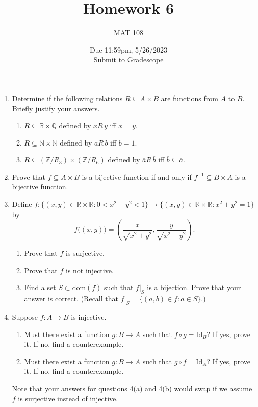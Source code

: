 \documentclass{article}
\title{Homework 6}
\author{MAT 108}
\date{Due 11:59pm, 5/26/2023\\ 
\vspace{0.1cm}
Submit to Gradescope}
\newcommand{\bR}{\mathbb{R}}
\newcommand{\bQ}{\mathbb{Q}}
\newcommand{\bZ}{\mathbb{Z}}
\newcommand{\bN}{\mathbb{N}}
\begin{document}
 
\maketitle

{\large

\begin{enumerate}[labelindent=0pt,leftmargin=0pt]

    \setlength{\itemsep}{13pt} 

    \item Determine if the following relations $R\subseteq A\times B$ are functions from $A$ to $B$. Briefly justify your answers.\begin{enumerate}
    \item $R\subseteq\bR\times\bQ$ defined by $xR\,y$ iff $x=y$.
    \item $R\subseteq\bN\times\bN$ defined by $aR\,b$ iff $b=1$.
    \item $R\subseteq (\bZ/R_3)\times(\bZ/R_6)$ defined by $\overline{a}R\,\overline{b}$ iff $\overline{b}\subseteq\overline{a}$.
    \end{enumerate}
    

    \item Prove that $f\subseteq A\times B$ is a bijective function if and only if $f^{-1}\subseteq B\times A$ is a bijective function.

    \item Define $f:\{(x,y)\in\bR\times\bR:0<x^2+y^2<1\}\to\{(x,y)\in\bR\times\bR:x^2+y^2=1\}$ by $$f\big((x,y)\big) = \left(\frac{x}{\sqrt{x^2+y^2}},\frac{y}{\sqrt{x^2+y^2}}\right).$$
    \begin{enumerate}
    \item Prove that $f$ is surjective.
    \item Prove that $f$ is not injective.
    \item Find a set $S\subset\text{dom}(f)$ such that $f|_S$ is a bijection. Prove that your answer is correct. (Recall that $f|_S=\{(a,b)\in f: a\in S\}$.)
    \end{enumerate}

    \item Suppose $f:A\to B$ is injective.
    \begin{enumerate}
    \item Must there exist a function $g:B\to A$ such that $f\circ g = \text{Id}_B$? If yes, prove it. If no, find a counterexample.
    \item Must there exist a function $g:B\to A$ such that $g\circ f = \text{Id}_A$? If yes, prove it. If no, find a counterexample.
    \end{enumerate}

Note that your answers for questions 4(a) and 4(b) would swap if we assume $f$ is surjective instead of injective.

    
    \end{enumerate}

}
\end{document}
